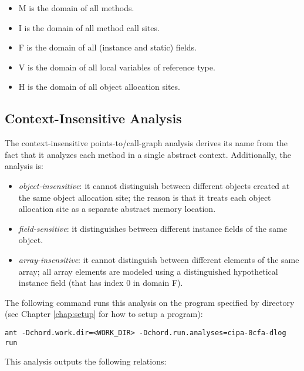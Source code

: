 \texonly{\newpage}

\begin{itemize}
\item M is the domain of all methods.
\item I is the domain of all method call sites.
\item F is the domain of all (instance and static) fields.
\item V is the domain of all local variables of reference type.
\item H is the domain of all object allocation sites.
\end{itemize}

\subsection{Context-Insensitive Analysis}

The context-insensitive points-to/call-graph analysis derives its name from the
fact that it analyzes each method in a single abstract context.
Additionally, the analysis is:
\begin{itemize}
\item
{\it object-insensitive}: it cannot distinguish between
different objects created at the same object allocation site; the reason is that
it treats each object allocation site as a separate abstract memory location.
\item
{\it field-sensitive}: it distinguishes between
different instance fields of the same object.
\item
{\it array-insensitive}: it cannot distinguish between
different elements of the same array; all array elements are modeled using a
distinguished hypothetical instance field (that has index 0 in domain F).
\end{itemize}

The following command runs this analysis on the program specified
by directory  (see Chapter \ref{chap:setup} for how to setup a
program):

\begin{framed}
\begin{verbatim}
ant -Dchord.work.dir=<WORK_DIR> -Dchord.run.analyses=cipa-0cfa-dlog run
\end{verbatim}
\end{framed}

This analysis outputs the following relations:


